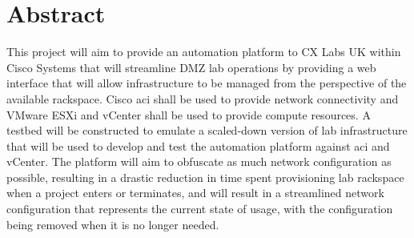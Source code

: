 \section*{Abstract}
This project will aim to provide an automation platform to CX Labs UK within Cisco Systems that will streamline DMZ lab operations by providing a web interface that will allow infrastructure to be managed from the perspective of the available rackspace. Cisco \gls{aci} shall be used to provide network connectivity and VMware ESXi and vCenter shall be used to provide compute resources. A testbed will be constructed to emulate a scaled-down version of lab infrastructure that will be used to develop and test the automation platform against \gls{aci} and vCenter. The platform will aim to obfuscate as much network configuration as possible, resulting in a drastic reduction in time spent provisioning lab rackspace when a project enters or terminates, and will result in a streamlined network configuration that represents the current state of usage, with the configuration being removed when it is no longer needed.
